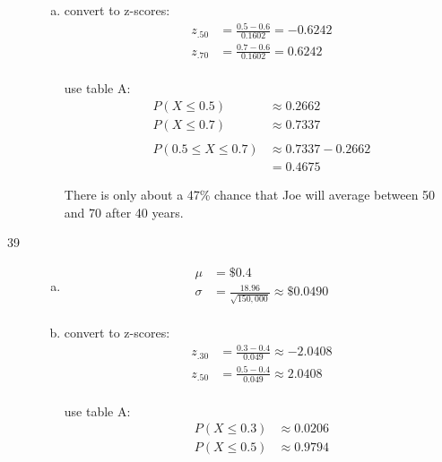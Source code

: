 \documentclass[letterpaper, landscape]{exam}
\newcommand{\cent}{\textcent\xspace}
\begin{document}
\begin{description}
\begin{enumerate}[(a)]
          \item
            convert to z-scores:
            \begin{align*}
              z_{.50} &= \frac{0.5 - 0.6}{0.1602} = -0.6242 \\
              z_{.70} &= \frac{0.7 - 0.6}{0.1602} = 0.6242 \\
            \end{align*}

            use table A:
            \begin{align*}
              P(X \leq 0.5) &\approx 0.2662 \\
              P(X \leq 0.7) &\approx 0.7337 \\
              \\
              P(0.5 \leq X \leq 0.7) & \approx 0.7337 - 0.2662 \\
                                     & = \boxed{ 0.4675 }
            \end{align*}

            There is only about a 47\% chance that Joe will average between
            50\cent and 70\cent after 40 years.

        \end{enumerate}

      \item[39]
        \begin{enumerate}[(a)]
          \item 
            \begin{align*}
              \mu    & = \boxed{ \$0.4 } \\
              \sigma & = \frac{18.96}{\sqrt{150,000}} \approx \boxed{ \$0.0490 }\\
            \end{align*}
            
          \item
            convert to z-scores:
            \begin{align*}
              z_{.30} &= \frac{0.3 - 0.4}{0.049} \approx -2.0408 \\ 
              z_{.50} &= \frac{0.5 - 0.4}{0.049} \approx 2.0408 \\
            \end{align*}

            use table A:
            \begin{align*}
              P(X \leq 0.3) &\approx 0.0206 \\
              P(X \leq 0.5) &\approx 0.9794 \\
            \end{align*}


\end{enumerate}
\end{description}
\end{document}
